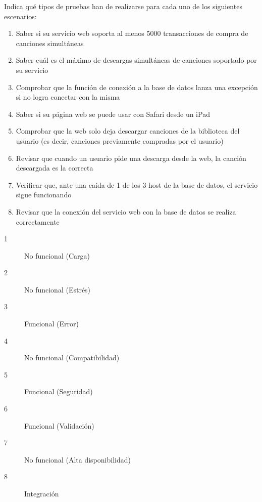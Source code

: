 

\begin{enunciado}
    Indica qué tipos de pruebas han de realizarse para cada uno de los siguientes escenarios:
    \begin{enumerate}
        \item Saber si su servicio web soporta al menos 5000 transacciones de compra de canciones simultáneas

        \item Saber cuál es el máximo de descargas simultáneas de canciones soportado por su servicio
        \item Comprobar que la función de conexión a la base de datos lanza una excepción si no logra
        conectar con la misma
        \item Saber si su página web se puede usar con Safari desde un iPad
        \item Comprobar que la web solo deja descargar canciones de la biblioteca del usuario (es decir, canciones previamente compradas por el usuario)
        \item Revisar que cuando un usuario pide una descarga desde la web, la canción descargada
        es la correcta
        \item Verificar que, ante una caída de 1 de los 3 host de la base de datos, el servicio sigue funcionando
        \item Revisar que la conexión del servicio web con la base de datos se realiza correctamente
    \end{enumerate}
\end{enunciado}

\begin{solucion}
    \begin{description}
        \item[1] No funcional (Carga)
        \item[2] No funcional (Estrés)
        \item[3] Funcional (Error)
        \item[4] No funcional (Compatibilidad)
        \item[5] Funcional (Seguridad)
        \item[6] Funcional (Validación)
        \item[7] No funcional (Alta disponibilidad)
        \item[8] Integración
    \end{description}
\end{solucion}